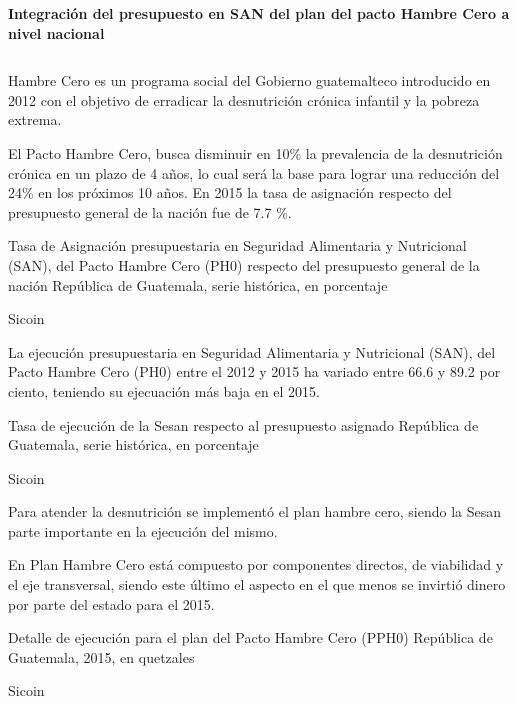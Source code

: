 
\begin{center}
	\textbf{\color{color2} \thesection} \quad  \textbf{Integración del presupuesto en SAN del plan del pacto Hambre Cero a nivel nacional} 
\end{center}
$\ $ \\[-5cm]
{%
	Hambre Cero es un programa social del Gobierno guatemalteco introducido  en 2012 con el objetivo de erradicar la desnutrición crónica infantil y la pobreza extrema.
	
	El Pacto Hambre Cero, busca disminuir en 10\% la prevalencia de la desnutrición crónica en un plazo de 4 años, lo cual será la base para lograr una reducción del 24\% en los próximos 10 años.  En 2015 la tasa de asignación respecto del presupuesto general de la nación fue de 7.7 \%.  
 }%
{%
Tasa de Asignación presupuestaria en Seguridad Alimentaria y Nutricional (SAN), del Pacto Hambre Cero (PH0) respecto del presupuesto general de la nación } %
{%
 República de Guatemala, serie histórica, en porcentaje} %
{%
 \begin{tikzpicture}[x=1pt,y=1pt]    \end{tikzpicture}}%
{%
 Sicoin} %


 {%
 	
 	
 	La ejecución presupuestaria en Seguridad Alimentaria y Nutricional (SAN), del Pacto Hambre Cero (PH0) entre el 2012 y 2015 ha variado entre 66.6 y 89.2 por ciento, teniendo su ejecuación más baja en el 2015.
 }%
 {%
 	Tasa de ejecución de la Sesan respecto al presupuesto asignado } %
 {%
 	República de Guatemala, serie histórica, en porcentaje} %
 {%
 	\begin{tikzpicture}[x=1pt,y=1pt]    \end{tikzpicture}}%
 {%
 	Sicoin} %
 
 
  {%
  	Para atender la desnutrición se implementó el plan hambre cero, siendo la Sesan parte importante en la ejecución del mismo. 
  		
  		En Plan Hambre Cero está compuesto por componentes directos, de viabilidad y el eje transversal, siendo este último el aspecto en el que menos se invirtió dinero por parte del estado para el 2015.
  }%
  {%
  	Detalle de ejecución para el plan del Pacto Hambre Cero (PPH0) } %
  {%
  	República de Guatemala, 2015, en quetzales} %
  {%
  	\begin{tikzpicture}[x=1pt,y=1pt]    \end{tikzpicture}}%
  {%
  	Sicoin} %
  
